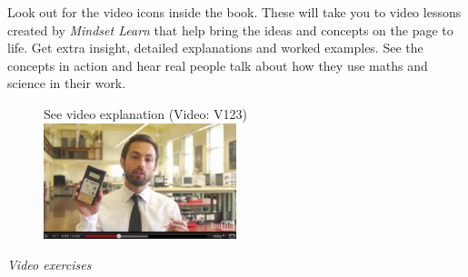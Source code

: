 {\Large

Look out for the video icons inside the book. These will take you to video lessons created by \textit{Mindset
Learn} that help bring the ideas and concepts on the page to life. Get extra insight, detailed
explanations and worked examples. See the concepts in action and hear real people talk about how they
use maths and science in their work. \par

\begin{figure}[h]
\begin{center}
See video explanation  (Video: V123)\\
\includegraphics[width=0.5\textwidth]{title_images/veritasiumvideo.eps}
\end{center}
\end{figure}

}
\vspace{0.5cm}
{\normalfont\sffamily\fontsize{22}\normalfont\itshape Video exercises} \par

